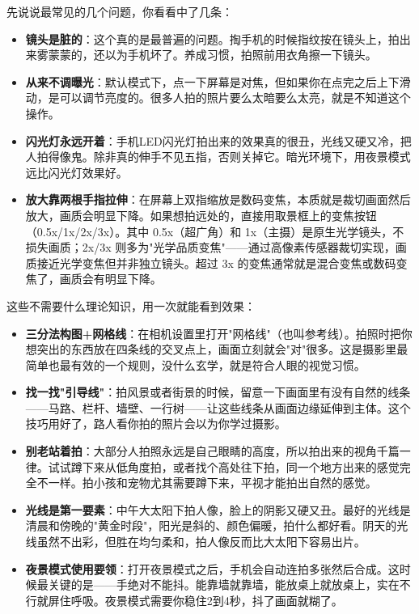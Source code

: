 


先说说最常见的几个问题，你看看中了几条：

\begin{itemize}
  \item \textbf{镜头是脏的}：这个真的是最普遍的问题。掏手机的时候指纹按在镜头上，拍出来雾蒙蒙的，还以为手机坏了。养成习惯，拍照前用衣角擦一下镜头。
  \item \textbf{从来不调曝光}：默认模式下，点一下屏幕是对焦，但如果你在点完之后上下滑动，是可以调节亮度的。很多人拍的照片要么太暗要么太亮，就是不知道这个操作。
  \item \textbf{闪光灯永远开着}：手机LED闪光灯拍出来的效果真的很丑，光线又硬又冷，把人拍得像鬼。除非真的伸手不见五指，否则关掉它。暗光环境下，用夜景模式远比闪光灯效果好。
  \item \textbf{放大靠两根手指拉伸}：在屏幕上双指缩放是数码变焦，本质就是裁切画面然后放大，画质会明显下降。如果想拍远处的，直接用取景框上的变焦按钮（0.5x/1x/2x/3x）。其中 0.5x（超广角）和 1x（主摄）是原生光学镜头，不损失画质；2x/3x 则多为"光学品质变焦"——通过高像素传感器裁切实现，画质接近光学变焦但并非独立镜头。超过 3x 的变焦通常就是混合变焦或数码变焦了，画质会有明显下降。
\end{itemize}


这些不需要什么理论知识，用一次就能看到效果：

\begin{itemize}
  \item \textbf{三分法构图+网格线}：在相机设置里打开"网格线"（也叫参考线）。拍照时把你想突出的东西放在四条线的交叉点上，画面立刻就会"对"很多。这是摄影里最简单也最有效的一个规则，没什么玄学，就是符合人眼的视觉习惯。
  \item \textbf{找一找"引导线"}：拍风景或者街景的时候，留意一下画面里有没有自然的线条——马路、栏杆、墙壁、一行树——让这些线条从画面边缘延伸到主体。这个技巧用好了，路人看你拍的照片会以为你学过摄影。
  \item \textbf{别老站着拍}：大部分人拍照永远是自己眼睛的高度，所以拍出来的视角千篇一律。试试蹲下来从低角度拍，或者找个高处往下拍，同一个地方出来的感觉完全不一样。拍小孩和宠物尤其需要蹲下来，平视才能拍出自然的感觉。
  \item \textbf{光线是第一要素}：中午大太阳下拍人像，脸上的阴影又硬又丑。最好的光线是清晨和傍晚的"黄金时段"，阳光是斜的、颜色偏暖，拍什么都好看。阴天的光线虽然不出彩，但胜在均匀柔和，拍人像反而比大太阳下容易出片。
  \item \textbf{夜景模式使用要领}：打开夜景模式之后，手机会自动连拍多张然后合成。这时候最关键的是——手绝对不能抖。能靠墙就靠墙，能放桌上就放桌上，实在不行就屏住呼吸。夜景模式需要你稳住2到4秒，抖了画面就糊了。
\end{itemize}

